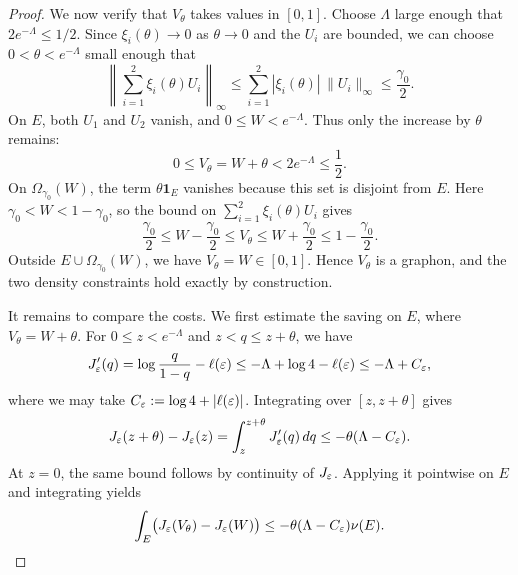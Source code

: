 \begin{proof}
We now verify that $V_\theta$ takes values in $[0,1]$.
Choose $\Lambda$ large enough that $2e^{-\Lambda}\le1/2$.
Since $\xi_i(\theta)\to0$ as $\theta\to0$ and the $U_i$ are bounded,
we can choose $0<\theta<e^{-\Lambda}$ small enough that
\[
  \left\|\sum_{i=1}^2\xi_i(\theta)U_i\right\|_\infty
  \le\sum_{i=1}^2|\xi_i(\theta)|\,\|U_i\|_\infty
  \le\frac{\gamma_0}{2}.
\]
On $E$, both $U_1$ and $U_2$ vanish, and $0\le W<e^{-\Lambda}$.
Thus only the increase by $\theta$ remains:
\[
  0\le V_\theta=W+\theta<2e^{-\Lambda}\le\frac12.
\]
On $\Omega_{\gamma_0}(W)$, the term $\theta\mathbf1_E$ vanishes because
this set is disjoint from $E$.  Here $\gamma_0<W<1-\gamma_0$, so the
bound on $\sum_{i=1}^2\xi_i(\theta)U_i$ gives
\[
  \frac{\gamma_0}{2}\le W-\frac{\gamma_0}{2}
  \le V_\theta\le W+\frac{\gamma_0}{2}\le1-\frac{\gamma_0}{2}.
\]
Outside $E\cup\Omega_{\gamma_0}(W)$, we have $V_\theta=W\in[0,1]$.
Hence $V_\theta$ is a graphon, and the two
density constraints hold exactly by construction.

It remains to compare the costs.  We first estimate the saving on $E$,
where $V_\theta=W+\theta$.  For $0\le z<e^{-\Lambda}$ and
$z<q\le z+\theta$, we have
\[
  J_\varepsilon'(q)=\log\frac q{1-q}-\ell(\varepsilon)
  \le-\Lambda+\log4-\ell(\varepsilon)\le-\Lambda+C_\varepsilon,
\]
where we may take $C_\varepsilon:=\log4+|\ell(\varepsilon)|$.
Integrating over $[z,z+\theta]$ gives
\[
  J_\varepsilon(z+\theta)-J_\varepsilon(z)
  =\int_z^{z+\theta}J_\varepsilon'(q)\,d q
  \le-\theta(\Lambda-C_\varepsilon).
\]
At $z=0$, the same bound follows by continuity of $J_\varepsilon$.
Applying it pointwise on $E$ and integrating yields
\[
  \int_E\bigl(J_\varepsilon(V_\theta)-J_\varepsilon(W)\bigr)
  \le-\theta(\Lambda-C_\varepsilon)\nu(E).
\]


\end{proof}

